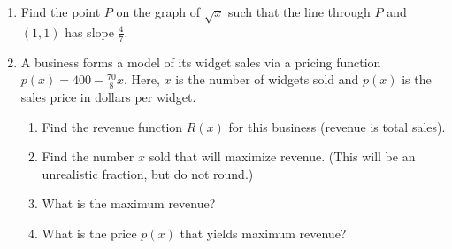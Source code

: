 \documentclass[11pt]{article}
\begin{document}
\begin{enumerate}
\begin{center}
\end{center}




\newpage

\item Find the point $P$ on the graph of $\sqrt{x}$ such that the line through $P$ and $(1,1)$ has slope $\displaystyle \frac{4}{7}$.
\vfill




\item A business forms a model of its widget sales via a pricing function $p(x) = 400-\frac{70}{8}x$. Here, $x$ is the number of widgets sold and $p(x)$ is the sales price in dollars per widget.  
\begin{enumerate}
\item Find the revenue function $R(x)$ for this business (revenue is total sales). 
\item Find the number $x$ sold that will maximize revenue. (This will be an unrealistic fraction,
but do not round.)
\item What is the maximum revenue? 
\item What is the price $p(x)$ that yields maximum revenue?
\end{enumerate}


\end{enumerate}
\end{document}
